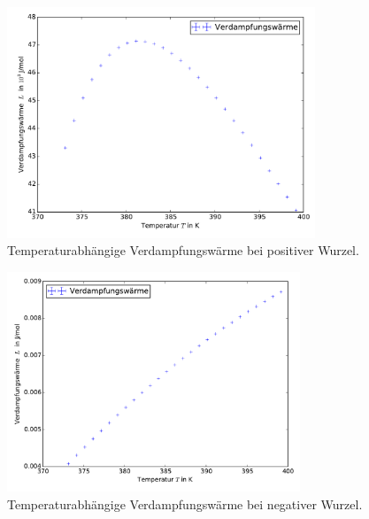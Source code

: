 \begin{figure}
  \centering
  \includegraphics[width=0.82\textwidth]{verdampfungwaerme3.pdf}
  \caption{Temperaturabhängige Verdampfungswärme bei positiver Wurzel.}
  \label{fig:fit3}
\end{figure}
\begin{figure}
  \centering
  \includegraphics[width=0.78\textwidth]{verdampfungwaerme4.pdf}
  \caption{Temperaturabhängige Verdampfungswärme bei negativer Wurzel.}
  \label{fig:fit4}
\end{figure}
